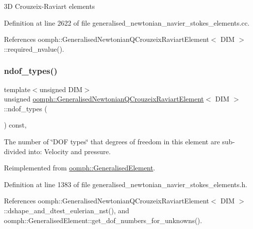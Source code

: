 3D Crouzeix-\/\+Raviart elements 



Definition at line 2622 of file generalised\+\_\+newtonian\+\_\+navier\+\_\+stokes\+\_\+elements.\+cc.



References oomph\+::\+Generalised\+Newtonian\+Q\+Crouzeix\+Raviart\+Element$<$ D\+I\+M $>$\+::required\+\_\+nvalue().

\mbox{\label{classoomph_1_1GeneralisedNewtonianQCrouzeixRaviartElement_ab29a7d2d94cc785438a76986b36de0a3}} 
\subsubsection{\texorpdfstring{ndof\+\_\+types()}{ndof\_types()}}
{\footnotesize\ttfamily template$<$unsigned D\+IM$>$ \\
unsigned \hyperlink{classoomph_1_1GeneralisedNewtonianQCrouzeixRaviartElement}{oomph\+::\+Generalised\+Newtonian\+Q\+Crouzeix\+Raviart\+Element}$<$ D\+IM $>$\+::ndof\+\_\+types (\begin{DoxyParamCaption}{ }\end{DoxyParamCaption}) const\hspace{0.3cm}{\ttfamily [inline]}, {\ttfamily [virtual]}}



The number of \char`\"{}\+D\+O\+F types\char`\"{} that degrees of freedom in this element are sub-\/divided into\+: Velocity and pressure. 



Reimplemented from \hyperlink{classoomph_1_1GeneralisedElement_a0c6037a870597b35dcf1c780710b9a56}{oomph\+::\+Generalised\+Element}.



Definition at line 1383 of file generalised\+\_\+newtonian\+\_\+navier\+\_\+stokes\+\_\+elements.\+h.



References oomph\+::\+Generalised\+Newtonian\+Q\+Crouzeix\+Raviart\+Element$<$ D\+I\+M $>$\+::dshape\+\_\+and\+\_\+dtest\+\_\+eulerian\+\_\+nst(), and oomph\+::\+Generalised\+Element\+::get\+\_\+dof\+\_\+numbers\+\_\+for\+\_\+unknowns().


